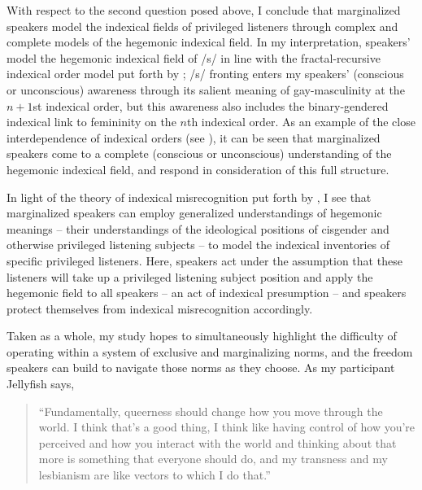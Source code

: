\documentclass[12pt,twoside]{reedthesis}
\begin{document}
With respect to the second question posed above, I conclude that marginalized speakers model the indexical fields of privileged listeners through complex and complete models of the hegemonic indexical field. In my interpretation, speakers' model the hegemonic indexical field of /s/ in line with the fractal-recursive indexical order model put forth by \textcite{calder_sissy_2019}; /s/ fronting enters my speakers' (conscious or unconscious) awareness through its salient meaning of gay-masculinity at the $n + 1$st indexical order, but this awareness also includes the binary-gendered indexical link to femininity on the $n$th indexical order. As an example of the close interdependence of indexical orders (see \cite{silverstein_indexical_2003}), it can be seen that marginalized speakers come to a complete (conscious or unconscious) understanding of the hegemonic indexical field, and respond in consideration of this full structure.

In light of the theory of indexical misrecognition put forth by \textcite{barrett_sexuality_2024}, I see that marginalized speakers can employ generalized understandings of hegemonic meanings -- their understandings of the ideological positions of cisgender and otherwise privileged listening subjects -- to model the indexical inventories of specific privileged listeners. Here, speakers act under the assumption that these listeners will take up a privileged listening subject position and apply the hegemonic field to all speakers -- an act of indexical presumption -- and speakers protect themselves from indexical misrecognition accordingly.

Taken as a whole, my study hopes to simultaneously highlight the difficulty of operating within a system of exclusive and marginalizing norms, and the freedom speakers can build to navigate those norms as they choose. As my participant Jellyfish says,
\begin{quote}
``Fundamentally, queerness should change how you move through the world. I think that's a good thing, I think like having control of how you're perceived and how you interact with the world and thinking about that more is something that everyone should do, and my transness and my lesbianism are like vectors to which I do that.''
\end{quote}

\end{document}
